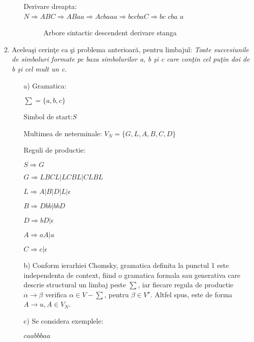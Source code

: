 \begin{enumerate}
\begin{itemize}
Derivare dreapta:
\\$N \Rightarrow ABC \Rightarrow ABaa \Rightarrow A cba aa \Rightarrow bccbaC \Rightarrow bc$ $cba$ $a$

\begin{figure}[h]
\centering
{}
\caption{Arbore sintactic descendent derivare stanga}
\end{figure}
\end{itemize}

\item
Aceleaşi cerinţe ca şi problema anterioară, pentru limbajul: \textit{Toate succesiunile de simboluri formate pe baza simbolurilor a, b şi c care conţin cel puţin doi de b şi cel mult un c.}

\begin{enumerate}
\item[a)]
Gramatica:

$\sum=\{a,b,c\}$

Simbol de start:$S$

Multimea de neterminale: $V_N=\{G,L,A,B,C,D\}$

Reguli de productie:

$S \Rightarrow G$

$G \Rightarrow LBCL|LCBL|CLBL$

$L \Rightarrow A|B|D|L|\epsilon$

$B \Rightarrow Dbb|bbD$

$D \Rightarrow bD|\epsilon$

$A \Rightarrow aA|a$

$C \Rightarrow c|\epsilon$

\item[b)]
Conform ierarhiei Chomsky, gramatica definita la punctul 1 este independenta de context, fiind o gramatica formala sau generativa care descrie structural un limbaj peste $\sum$, iar fiecare regula de productie $\alpha \longrightarrow \beta$
 verifica $ \alpha \in V- \sum$, pentru $\beta \in V^\star$. Altfel spus, este de forma $A \longrightarrow u, A \in V_N$.

\item[c)]
Se considera exemplele:

$caabbbaa$


\end{enumerate}
\end{enumerate}
